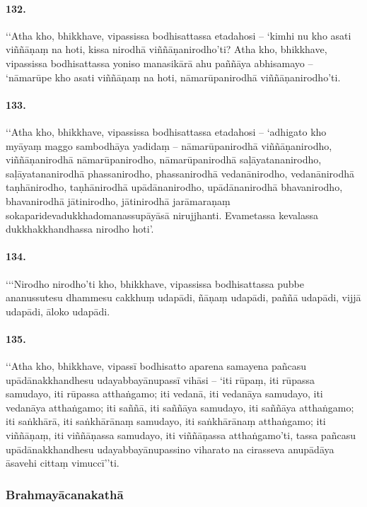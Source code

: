 \paragraph{132.} ‘‘Atha kho, bhikkhave, vipassissa bodhisattassa etadahosi – ‘kimhi nu kho asati viññāṇaṃ na hoti, kissa nirodhā viññāṇanirodho’ti? Atha kho, bhikkhave, vipassissa bodhisattassa yoniso manasikārā ahu paññāya abhisamayo – ‘nāmarūpe kho asati viññāṇaṃ na hoti, nāmarūpanirodhā viññāṇanirodho’ti.

\paragraph{133.} ‘‘Atha kho, bhikkhave, vipassissa bodhisattassa etadahosi – ‘adhigato kho myāyaṃ maggo sambodhāya yadidaṃ – nāmarūpanirodhā viññāṇanirodho, viññāṇanirodhā nāmarūpanirodho, nāmarūpanirodhā saḷāyatananirodho, saḷāyatananirodhā phassanirodho, phassanirodhā vedanānirodho, vedanānirodhā taṇhānirodho, taṇhānirodhā upādānanirodho, upādānanirodhā bhavanirodho, bhavanirodhā jātinirodho, jātinirodhā jarāmaraṇaṃ sokaparidevadukkhadomanassupāyāsā nirujjhanti. Evametassa kevalassa dukkhakkhandhassa nirodho hoti’.

\paragraph{134.} ‘‘‘Nirodho nirodho’ti kho, bhikkhave, vipassissa bodhisattassa pubbe ananussutesu dhammesu cakkhuṃ udapādi, ñāṇaṃ udapādi, paññā udapādi, vijjā udapādi, āloko udapādi.

\paragraph{135.} ‘‘Atha kho, bhikkhave, vipassī bodhisatto aparena samayena pañcasu upādānakkhandhesu udayabbayānupassī vihāsi – ‘iti rūpaṃ, iti rūpassa samudayo, iti rūpassa atthaṅgamo; iti vedanā, iti vedanāya samudayo, iti vedanāya atthaṅgamo; iti saññā, iti saññāya samudayo, iti saññāya atthaṅgamo; iti saṅkhārā, iti saṅkhārānaṃ samudayo, iti saṅkhārānaṃ atthaṅgamo; iti viññāṇaṃ, iti viññāṇassa samudayo, iti viññāṇassa atthaṅgamo’ti, tassa pañcasu upādānakkhandhesu udayabbayānupassino viharato na cirasseva anupādāya āsavehi cittaṃ vimuccī’’ti.


\subsubsection{Brahmayācanakathā}


